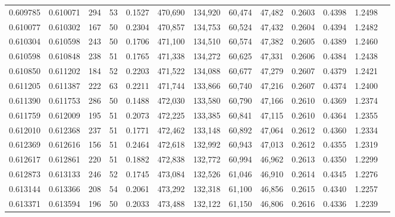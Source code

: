 \begin{tabular}{rrrrrrrrrrrrr}
0.609785 & 0.610071 &   294 &  53 &                                     0.1527 & 470,690 & 134,920 &  60,474 &  47,482 & 0.2603 & 0.4398 & 1.2498 \\
0.610077 & 0.610302 &   167 &  50 &                                     0.2304 & 470,857 & 134,753 &  60,524 &  47,432 & 0.2604 & 0.4394 & 1.2482 \\
0.610304 & 0.610598 &   243 &  50 &                                     0.1706 & 471,100 & 134,510 &  60,574 &  47,382 & 0.2605 & 0.4389 & 1.2460 \\
0.610598 & 0.610848 &   238 &  51 &                                     0.1765 & 471,338 & 134,272 &  60,625 &  47,331 & 0.2606 & 0.4384 & 1.2438 \\
0.610850 & 0.611202 &   184 &  52 &                                     0.2203 & 471,522 & 134,088 &  60,677 &  47,279 & 0.2607 & 0.4379 & 1.2421 \\
0.611205 & 0.611387 &   222 &  63 &                                     0.2211 & 471,744 & 133,866 &  60,740 &  47,216 & 0.2607 & 0.4374 & 1.2400 \\
0.611390 & 0.611753 &   286 &  50 &                                     0.1488 & 472,030 & 133,580 &  60,790 &  47,166 & 0.2610 & 0.4369 & 1.2374 \\
0.611759 & 0.612009 &   195 &  51 &                                     0.2073 & 472,225 & 133,385 &  60,841 &  47,115 & 0.2610 & 0.4364 & 1.2355 \\
0.612010 & 0.612368 &   237 &  51 &                                     0.1771 & 472,462 & 133,148 &  60,892 &  47,064 & 0.2612 & 0.4360 & 1.2334 \\
0.612369 & 0.612616 &   156 &  51 &                                     0.2464 & 472,618 & 132,992 &  60,943 &  47,013 & 0.2612 & 0.4355 & 1.2319 \\
0.612617 & 0.612861 &   220 &  51 &                                     0.1882 & 472,838 & 132,772 &  60,994 &  46,962 & 0.2613 & 0.4350 & 1.2299 \\
0.612873 & 0.613133 &   246 &  52 &                                     0.1745 & 473,084 & 132,526 &  61,046 &  46,910 & 0.2614 & 0.4345 & 1.2276 \\
0.613144 & 0.613366 &   208 &  54 &                                     0.2061 & 473,292 & 132,318 &  61,100 &  46,856 & 0.2615 & 0.4340 & 1.2257 \\
0.613371 & 0.613594 &   196 &  50 &                                     0.2033 & 473,488 & 132,122 &  61,150 &  46,806 & 0.2616 & 0.4336 & 1.2239 \\

\end{tabular}
